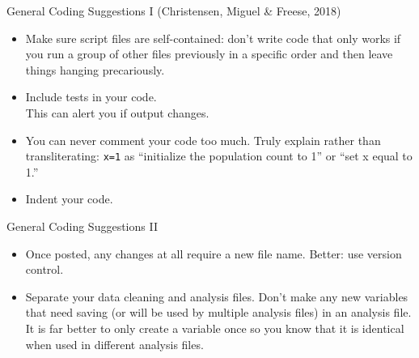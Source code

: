 \documentclass[ignorenonframetext,]{beamer}
\providecommand{\tightlist}{%
  \setlength{\itemsep}{0pt}\setlength{\parskip}{0pt}}
\begin{document}
\begin{frame}{General Coding Suggestions I (Christensen, Miguel \&
Freese, 2018)}
\protect\hypertarget{general-coding-suggestions-i-christensen-miguel-freese-2018}{}

\begin{itemize}
\item
  Make sure script files are self-contained: don't write code that only
  works if you run a group of other files previously in a specific order
  and then leave things hanging precariously.
\item
  Include tests in your code.\\
  This can alert you if output changes.
\item
  You can never comment your code too much. Truly explain rather than
  transliterating: \texttt{x=1} as ``initialize the population count to
  1'' or ``set x equal to 1.''
\item
  Indent your code.
\end{itemize}

\end{frame}

\begin{frame}{General Coding Suggestions II}
\protect\hypertarget{general-coding-suggestions-ii}{}

\begin{itemize}
\tightlist
\item
  Once posted, any changes at all require a new file name. Better: use
  version control.\\
\item
  Separate your data cleaning and analysis files. Don't make any new
  variables that need saving (or will be used by multiple analysis
  files) in an analysis file. It is far better to only create a variable
  once so you know that it is identical when used in different analysis
  files.
\end{itemize}

\end{frame}
\end{document}
